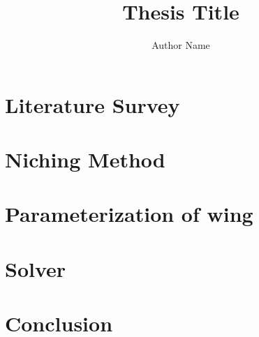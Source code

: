 \documentclass[10pt,twoside]{report}
\title{Thesis Title}
\author{Author Name}
\begin{document}


\tableofcontents
\listoffigures


\chapter{Literature Survey}

\chapter{Niching Method}               %
 

\chapter{Parameterization of wing}     %


\chapter{Solver}                       %


\chapter{Conclusion}                   %


%
\printbibliography
\end{document}
